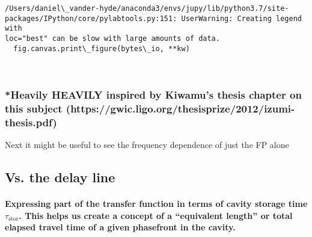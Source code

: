 \documentclass[11pt]{article}
\begin{document}
    \begin{Verbatim}[commandchars=\\\{\}]
/Users/daniel\_vander-hyde/anaconda3/envs/jupy/lib/python3.7/site-
packages/IPython/core/pylabtools.py:151: UserWarning: Creating legend with
loc="best" can be slow with large amounts of data.
  fig.canvas.print\_figure(bytes\_io, **kw)
    \end{Verbatim}

    \begin{center}
    \end{center}
    { \hspace*{\fill} \\}
    
    \hypertarget{heavily-heavily-inspired-by-kiwamus-thesis-chapter-on-this-subject-httpsgwic.ligo.orgthesisprize2012izumi-thesis.pdf}{%
\subsubsection{*Heavily HEAVILY inspired by Kiwamu's thesis chapter on
this subject
(https://gwic.ligo.org/thesisprize/2012/izumi-thesis.pdf)}\label{heavily-heavily-inspired-by-kiwamus-thesis-chapter-on-this-subject-httpsgwic.ligo.orgthesisprize2012izumi-thesis.pdf}}

    Next it might be useful to see the frequency dependence of just the FP
alone

    \hypertarget{vs.-the-delay-line}{%
\subsection{Vs. the delay line}\label{vs.-the-delay-line}}

    \hypertarget{expressing-part-of-the-transfer-function-in-terms-of-cavity-storage-time-tau_mathrmstor.-this-helps-us-create-a-concept-of-a-equivalent-length-or-total-elapsed-travel-time-of-a-given-phasefront-in-the-cavity.}{%
\paragraph{\texorpdfstring{Expressing part of the transfer function in
terms of cavity storage time \(\tau_\mathrm{stor}\). This helps us
create a concept of a ``equivalent length'' or total elapsed travel time
of a given phasefront in the
cavity.}{Expressing part of the transfer function in terms of cavity storage time \textbackslash tau\_\textbackslash mathrm\{stor\}. This helps us create a concept of a ``equivalent length'' or total elapsed travel time of a given phasefront in the cavity.}}\label{expressing-part-of-the-transfer-function-in-terms-of-cavity-storage-time-tau_mathrmstor.-this-helps-us-create-a-concept-of-a-equivalent-length-or-total-elapsed-travel-time-of-a-given-phasefront-in-the-cavity.}}
\end{document}
